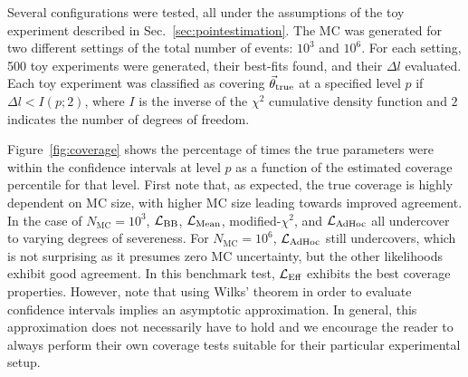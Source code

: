 Several configurations were tested, all under the assumptions of the toy experiment described in Sec.~\ref{sec:pointestimation}. The MC was generated for two different settings of the total number of events: $10^3$ and $10^6$. For each setting, 500 toy experiments were generated, their best-fits found, and their $\Delta l$ evaluated. Each toy experiment was classified as covering $\vec{\theta}_{\rm true}$ at a specified level $p$ if $\Delta l < I(p;2)$, where $I$ is the inverse of the $\chi^2$ cumulative density function and $2$ indicates the number of degrees of freedom.

Figure~\ref{fig:coverage} shows the percentage of times the true parameters were within the confidence intervals at level $p$ as a function of the estimated coverage percentile for that level. First note that, as expected, the true coverage is highly dependent on MC size, with higher MC size leading towards improved agreement. In the case of $N_\mathrm{MC}=10^3$, $\mathcal{L}_{\textmd{BB}}$, $\mathcal{L}_{\textmd{Mean}}$, modified-$\chi^2$, and $\mathcal{L}_{\textmd{AdHoc}}$ all undercover to varying degrees of severeness. For $N_\mathrm{MC}=10^6$, $\mathcal{L}_{\textmd{AdHoc}}$ still undercovers, which is not surprising as it presumes zero MC uncertainty, but the other likelihoods exhibit good agreement. In this benchmark test, $\mathcal{L}_\textmd{Eff}$ exhibits the best coverage properties. However, note that using Wilks’ theorem in order to evaluate confidence intervals implies an asymptotic approximation. In general, this approximation does not necessarily have to hold and we encourage the reader to always perform their own coverage tests suitable for their particular experimental setup.
